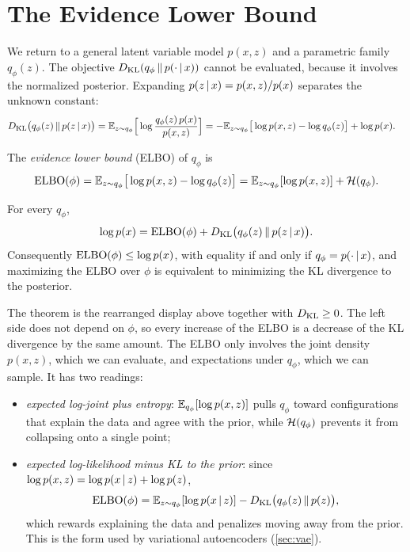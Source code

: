 \section{The Evidence Lower Bound}\label{sec:elbo}

We return to a general latent variable model $p(x,z)$ and a parametric family $q_\phi(z)$. The objective $D_{\mathrm{KL}}(q_\phi\,\|\,p(\cdot\,|\, x))$ cannot be evaluated, because it involves the normalized posterior. Expanding $p(z\,|\, x)=p(x,z)/p(x)$ separates the unknown constant:
\begin{align*}
D_{\mathrm{KL}}\big(q_\phi(z)\,\|\,p(z\,|\, x)\big)
&=\mathbb{E}_{z\sim q_\phi}\Big[\log\frac{q_\phi(z)\,p(x)}{p(x,z)}\Big]
=-\mathbb{E}_{z\sim q_\phi}\big[\log p(x,z)-\log q_\phi(z)\big]+\log p(x).
\end{align*}

\begin{definition}\label{def:elbo}
The \emph{evidence lower bound} (ELBO) of $q_\phi$ is
\[
\operatorname{ELBO}(\phi)=\mathbb{E}_{z\sim q_\phi}\big[\log p(x,z)-\log q_\phi(z)\big]=\mathbb{E}_{z\sim q_\phi}[\log p(x,z)]+\mathcal{H}(q_\phi).
\]
\end{definition}

\begin{theorem}\label{thm:elbo}
For every $q_\phi$,
\[
\log p(x)=\operatorname{ELBO}(\phi)+D_{\mathrm{KL}}\big(q_\phi(z)\,\|\,p(z\,|\, x)\big).
\]
Consequently $\operatorname{ELBO}(\phi)\le\log p(x)$, with equality if and only if $q_\phi=p(\cdot\,|\, x)$, and maximizing the ELBO over $\phi$ is equivalent to minimizing the KL divergence to the posterior.
\end{theorem}

The theorem is the rearranged display above together with $D_{\mathrm{KL}}\ge0$. The left side does not depend on $\phi$, so every increase of the ELBO is a decrease of the KL divergence by the same amount. The ELBO only involves the joint density $p(x,z)$, which we can evaluate, and expectations under $q_\phi$, which we can sample. It has two readings:
\begin{itemize}
  \item \emph{expected log-joint plus entropy}: $\mathbb{E}_{q_\phi}[\log p(x,z)]$ pulls $q_\phi$ toward configurations that explain the data and agree with the prior, while $\mathcal{H}(q_\phi)$ prevents it from collapsing onto a single point;
  \item \emph{expected log-likelihood minus KL to the prior}: since $\log p(x,z)=\log p(x\,|\, z)+\log p(z)$,
  \begin{equation}\label{eq:elbo-recon-kl}
  \operatorname{ELBO}(\phi)=\mathbb{E}_{z\sim q_\phi}[\log p(x\,|\, z)]-D_{\mathrm{KL}}\big(q_\phi(z)\,\|\,p(z)\big),
  \end{equation}
  which rewards explaining the data and penalizes moving away from the prior. This is the form used by variational autoencoders (\cref{sec:vae}).
\end{itemize}

